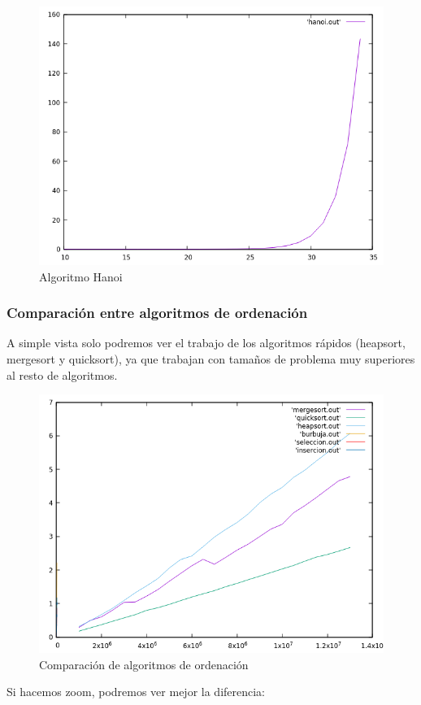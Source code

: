 \documentclass[12pt,spanish]{article}
\begin{document}
\begin{figure}[H]
\centering
\includegraphics[scale=0.75]{empirica_hanoi.png}
\caption{Algoritmo Hanoi}
\end{figure}

\subsubsection{Comparación entre algoritmos de ordenación}
A simple vista solo podremos ver el trabajo de los algoritmos rápidos (heapsort, mergesort y quicksort), ya que trabajan con tamaños de problema muy superiores al resto de algoritmos.

\begin{figure}[H]
\centering
\includegraphics[scale=0.75]{empirica_ordenacion_comparacion.png}
\caption{Comparación de algoritmos de ordenación}
\end{figure}
Si hacemos zoom, podremos ver mejor la diferencia:
\end{document}
